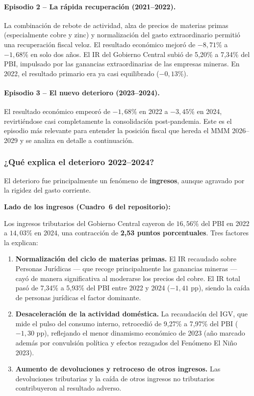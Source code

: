 \documentclass[12pt, a4paper]{article}
\newcommand{\emp}[1]{\textbf{#1}}
\begin{document}
\paragraph{Episodio 2 -- La rápida recuperación (2021--2022).}
La combinación de rebote de actividad, alza de precios de materias primas
(especialmente cobre y zinc) y normalización del gasto extraordinario permitió
una recuperación fiscal veloz. El resultado económico mejoró de $-8{,}71\%$
a $-1{,}68\%$ en solo dos años. El IR del Gobierno Central subió de 5{,}20\%
a 7{,}34\% del PBI, impulsado por las ganancias extraordinarias de las empresas
mineras. En 2022, el resultado primario era ya casi equilibrado ($-0{,}13\%$).

\paragraph{Episodio 3 -- El nuevo deterioro (2023--2024).}
El resultado económico empeoró de $-1{,}68\%$ en 2022 a $-3{,}45\%$ en 2024,
revirtiéndose casi completamente la consolidación post-pandemia. Este es el
episodio más relevante para entender la posición fiscal que hereda el MMM
2026--2029 y se analiza en detalle a continuación.

\subsubsection*{¿Qué explica el deterioro 2022--2024?}

El deterioro fue principalmente un fenómeno de \emp{ingresos}, aunque agravado
por la rigidez del gasto corriente.

\bigskip
\noindent\textbf{Lado de los ingresos (Cuadro~6 del repositorio):}

Los ingresos tributarios del Gobierno Central cayeron de
$16{,}56\%$ del PBI en 2022 a $14{,}03\%$ en 2024, una contracción de
\emp{2{,}53 puntos porcentuales}. Tres factores la explican:

\begin{enumerate}[leftmargin=1.5em]
    \item \emp{Normalización del ciclo de materias primas.} El IR recaudado
          sobre Personas Jurídicas --- que recoge principalmente las ganancias
          mineras --- cayó de manera significativa al moderarse los precios
          del cobre. El IR total pasó de 7{,}34\% a 5{,}93\% del PBI entre
          2022 y 2024 ($-1{,}41$ pp), siendo la caída de personas jurídicas
          el factor dominante.
    \item \emp{Desaceleración de la actividad doméstica.} La recaudación del
          IGV, que mide el pulso del consumo interno, retrocedió de 9{,}27\%
          a 7{,}97\% del PBI ($-1{,}30$ pp), reflejando el menor dinamismo
          económico de 2023 (año marcado además por convulsión política y
          efectos rezagados del Fenómeno El Niño 2023).
    \item \emp{Aumento de devoluciones y retroceso de otros ingresos.}
          Las devoluciones tributarias y la caída de otros ingresos
          no tributarios contribuyeron al resultado adverso.
\end{enumerate}
\end{document}
